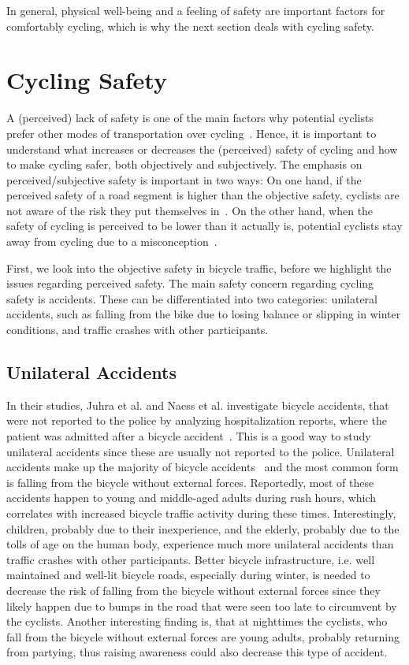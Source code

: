 In general, physical well-being and a feeling of safety are important factors for comfortably cycling, which is why the next section deals with cycling safety.
  

\section{Cycling Safety}
\label{sec:cycling_safety_background}
A (perceived) lack of safety is one of the main factors why potential cyclists prefer other modes of transportation over cycling~\cite{felix2020build,nazemi2021studying,lawson2013perception}.
Hence, it is important to understand what increases or decreases the (perceived) safety of cycling and how to make cycling safer, both objectively and subjectively.
The emphasis on perceived/subjective safety is important in two ways:
On one hand, if the perceived safety of a road segment is higher than the objective safety, cyclists are not aware of the risk they put themselves in~\cite{christ2023perceiving}.
On the other hand, when the safety of cycling is perceived to be lower than it actually is, potential cyclists stay away from cycling due to a misconception~\cite{noland1995perceived}.

First, we look into the objective safety in bicycle traffic, before we highlight the issues regarding perceived safety.
The main safety concern regarding cycling safety is accidents.
These can be differentiated into two categories:  unilateral accidents, such as falling from the bike due to losing balance or slipping in winter conditions, and traffic crashes with other participants.

\subsection*{Unilateral Accidents}
In their studies, Juhra et al. and Naess et al. investigate bicycle accidents, that were not reported to the police by analyzing hospitalization reports, where the patient was admitted after a bicycle accident~\cite{juhra2012bicycle,naess2020number}.
This is a good way to study unilateral accidents since these are usually not reported to the police.
Unilateral accidents make up the majority of bicycle accidents~\cite{juhra2012bicycle,naess2020number} and the most common form is falling from the bicycle without external forces.
Reportedly, most of these accidents happen to young and middle-aged adults during rush hours, which correlates with increased bicycle traffic activity during these times.
Interestingly, children, probably due to their inexperience, and the elderly, probably due to the tolls of age on the human body, experience much more unilateral accidents than traffic crashes with other participants.
Better bicycle infrastructure, i.e. well maintained and well-lit bicycle roads, especially during winter, is needed to decrease the risk of falling from the bicycle without external forces since they likely happen due to bumps in the road that were seen too late to circumvent by the cyclists.
Another interesting finding is, that at nighttimes the cyclists, who fall from the bicycle without external forces are young adults, probably returning from partying, thus raising awareness could also decrease this type of accident.

